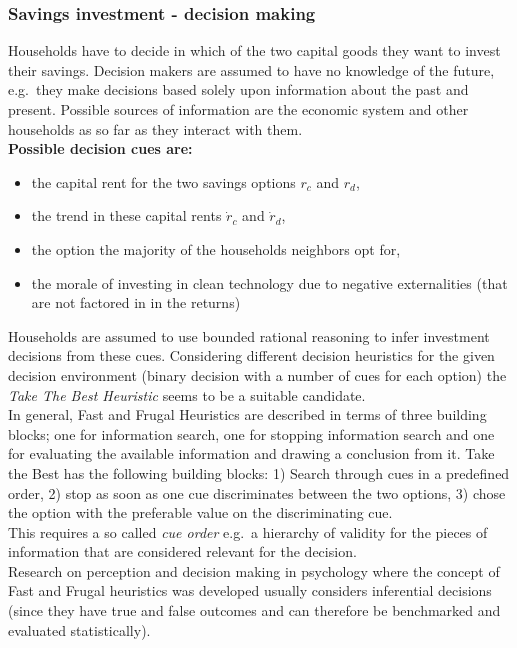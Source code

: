 \subsubsection{Savings investment - decision making}
Households have to decide in which of the two capital goods they want to invest their savings. Decision makers are assumed to have no knowledge of the future, e.g.\ they make decisions based solely upon information about the past and present. Possible sources of information are the economic system and other households as so far as they interact with them.\\
\textbf{Possible decision cues are:}
\begin{itemize}
	\item the capital rent for the two savings options $r_c$ and $r_d$,
	\item the trend in these capital rents $\dot{r}_c$ and $\dot{r}_d$,
	\item the option the majority of the households neighbors opt for,
	\item the morale of investing in clean technology due to negative externalities (that are not factored in in the returns)
\end{itemize}
Households are assumed to use bounded rational reasoning to infer investment decisions from these cues. Considering different decision heuristics for the given decision environment (binary decision with a number of cues for each option) the \textit{Take The Best Heuristic} seems to be a suitable candidate. \\
In general, Fast and Frugal Heuristics are described in terms of three building blocks; one for information search, one for stopping information search and one for evaluating the available information and drawing a conclusion from it.
Take the Best has the following building blocks: 1) Search through cues in a predefined order, 2) stop as soon as one cue discriminates between the two options, 3) chose the option with the preferable value on the discriminating cue. \\
This requires a so called \textit{cue order} e.g.\ a hierarchy of validity for the pieces of information that are considered relevant for the decision. \\
Research on perception and decision making in psychology where the concept of Fast and Frugal heuristics was developed usually considers inferential decisions (since they have true and false outcomes and can therefore be benchmarked and evaluated statistically).\\
